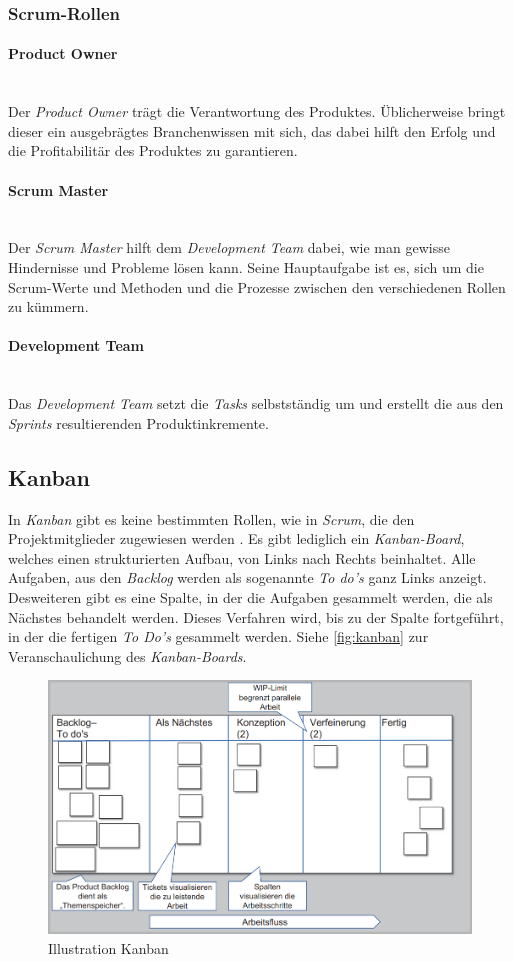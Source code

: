 \subsubsection{Scrum-Rollen}
\paragraph{Product Owner}~\\
Der \textit{Product Owner} trägt die Verantwortung des Produktes. Üblicherweise bringt dieser ein ausgebrägtes Branchenwissen mit sich, das dabei hilft den Erfolg und die Profitabilitär des Produktes zu garantieren.
\paragraph{Scrum Master}~\\
Der \textit{Scrum Master} hilft dem \textit{Development Team} dabei, wie man gewisse Hindernisse und Probleme lösen kann. Seine Hauptaufgabe ist es, sich um die Scrum-Werte und Methoden und die Prozesse zwischen den verschiedenen Rollen zu kümmern.
\paragraph{Development Team}~\\
Das \textit{Development Team} setzt die \textit{Tasks} selbstständig um und erstellt die aus den \textit{Sprints} resultierenden Produktinkremente.

\subsection{Kanban}
In \textit{Kanban} gibt es keine bestimmten Rollen, wie in \textit{Scrum}, die den Projektmitglieder zugewiesen werden \cite{pm-agil-ursula}. Es gibt lediglich ein \textit{Kanban-Board}, welches einen strukturierten Aufbau, von Links nach Rechts beinhaltet. Alle Aufgaben, aus den \textit{Backlog} werden als sogenannte \textit{To do's} ganz Links anzeigt. Desweiteren gibt es eine Spalte, in der die Aufgaben gesammelt werden, die als Nächstes behandelt werden. Dieses Verfahren wird, bis zu der Spalte fortgeführt, in der die fertigen \textit{To Do's} gesammelt werden. Siehe \autoref{fig:kanban} zur Veranschaulichung des \textit{Kanban-Boards}. 
\begin{figure}[H]
	\centering
	\includegraphics[width=0.6\linewidth]{images/projektmanagement/kanban}
	\caption[Kanban]{Illustration Kanban \cite{pm-agil-ursula}}
	\label{fig:kanban}
\end{figure}
